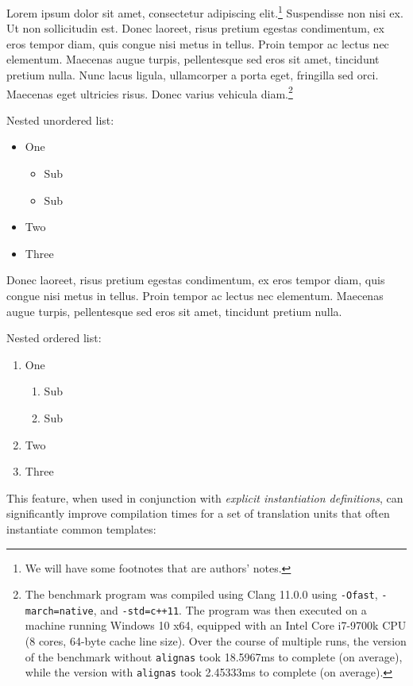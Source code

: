 Lorem ipsum dolor sit amet, consectetur
adipiscing elit.{\cprotect\footnote{\authorsnote We will have
some footnotes that are authors' notes.}} Suspendisse non nisi ex. Ut non sollicitudin est. Donec
laoreet, risus pretium egestas condimentum, ex eros tempor diam, quis
congue nisi metus in tellus. Proin tempor ac lectus nec elementum.
Maecenas augue turpis, pellentesque sed eros sit amet, tincidunt pretium
nulla. Nunc lacus ligula, ullamcorper a porta eget, fringilla sed orci.
Maecenas eget ultricies risus. Donec varius vehicula diam.{\cprotect\footnote{The benchmark
program was compiled using Clang 11.0.0 using \lstinline!-Ofast!,
\lstinline!-march=native!, and \mbox{\lstinline!-std=c++11!}. The program was then
executed on a machine running Windows 10 x64, equipped with an Intel
Core i7-9700k CPU (8 cores, 64-byte cache line size). Over the
course of multiple runs, the version of the benchmark without
\lstinline!alignas! took 18.5967ms to complete (on average), while the
version with \lstinline!alignas! took 2.45333ms to complete (on average).}}
  

Nested unordered list:

\begin{itemize}
\item{One\begin{itemize}
\item{Sub}
\item{Sub}
\end{itemize}
}
\item{Two}
\item{Three}
\end{itemize}

Donec
laoreet, risus pretium egestas condimentum, ex eros tempor diam, quis
congue nisi metus in tellus. Proin tempor ac lectus nec elementum.
Maecenas augue turpis, pellentesque sed eros sit amet, tincidunt pretium
nulla. %

Nested ordered list:

\begin{enumerate}\setlength{\leftmarginii}{6mm}
\item{One\begin{enumerate}
\item{Sub}
\item{Sub}
\end{enumerate}
}
\item{Two}
\item{Three}
\end{enumerate}

This feature, when used in conjunction with \emph{explicit instantiation
definitions}, can significantly improve compilation times for a set of
translation units that often instantiate common templates:

